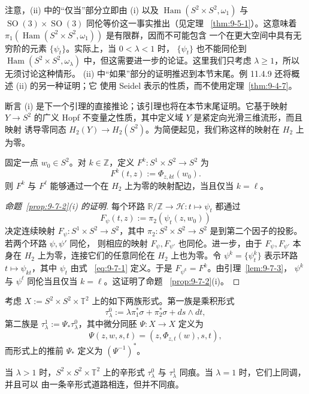 注意，(ii) 中的“仅当”部分立即由 (i) 以及
$\operatorname{Ham}(S^2\times S^2,\omega_1)$ 与
$\operatorname{SO}(3)\times\operatorname{SO}(3)$ 同伦等价这一事实推出（见定理
~\ref{thm:9-5-1}）。这意味着
$\pi_1(\operatorname{Ham}(S^2\times S^2,\omega_1))$ 是有限群，因而不可能包含
一个在更大空间中具有无穷阶的元素 $\{\psi_t\}$。实际上，当 $0<\lambda<1$ 时，
$\{\psi_t\}$ 也不能同伦到 $\operatorname{Ham}(S^2\times S^2,\omega_\lambda)$
中，但这需要进一步的论证。这里我们只考虑 $\lambda\ge1$，所以无须讨论这种情形。
(ii) 中“如果”部分的证明推迟到本节末尾。例 11.4.9 还将概述 (ii) 的另一种证明；它
使用 Seidel 表示的性质，而不使用定理~\ref{thm:9-4-7}。

断言 (i) 是下一个引理的直接推论；该引理也将在本节末尾证明。它基于映射
$Y\to S^2$ 的广义 Hopf 不变量之性质，其中定义域 $Y$ 是紧定向光滑三维流形，而且映射
诱导零同态 $H_2(Y)\to H_2(S^2)$。为简便起见，我们称这样的映射在 $H_2$ 上为零。

\begin{lemma}\label{lem:9-7-3}
固定一点 $w_0\in S^2$。对 $k\in\mathbb Z$，定义
$F^k:S^1\times S^2\to S^2$ 为
\[
  F^k(t,z):=\Phi_{z,kt}(w_0).
\]
则 $F^k$ 与 $F^\ell$ 能够通过一个在 $H_2$ 上为零的映射配边，当且仅当 $k=\ell$。
\end{lemma}

\begin{proof}[命题~\ref{prop:9-7-2}(i) 的证明]
每个环路 $\mathbb R/\mathbb Z\to\mathcal H:t\mapsto\psi_t$ 都通过
\[
  F_\psi(t,z):=\pi_2(\psi_t(z,w_0))
\]
决定连续映射 $F_\psi:S^1\times S^2\to S^2$，其中
$\pi_2:S^2\times S^2\to S^2$ 是到第二个因子的投影。若两个环路 $\psi,\psi'$ 同伦，
则相应的映射 $F_\psi,F_{\psi'}$ 也同伦。进一步，由于 $F_\psi,F_{\psi'}$ 本身在
$H_2$ 上为零，连接它们的任意同伦在 $H_2$ 上也为零。令
$\psi^k=\{\psi_t^k\}$ 表示环路 $t\mapsto\psi_{kt}$，其中 $\psi_t$ 由式
~\eqref{eq:9-7-1} 定义。于是 $F_{\psi^k}=F^k$。由引理~\ref{lem:9-7-3}，
$\psi^k$ 与 $\psi^\ell$ 同伦当且仅当 $k=\ell$。这证明了命题
~\ref{prop:9-7-2}(i)。
\end{proof}

考虑 $X:=S^2\times S^2\times\mathbb T^2$ 上的如下两族形式。第一族是乘积形式
\[
  \tau_\lambda^0:=\lambda\pi_1^*\sigma+\pi_2^*\sigma+ds\wedge dt,
\]
第二族是 $\tau_\lambda^1:=\Psi_*\tau_\lambda^0$，其中微分同胚
$\Psi:X\to X$ 定义为
\[
  \Psi(z,w,s,t)=(z,\Phi_{z,t}(w),s,t),
\]
而形式上的推前 $\Psi_*$ 定义为 $(\Psi^{-1})^*$。

\begin{theorem}\label{thm:9-7-4}
当 $\lambda>1$ 时，$S^2\times S^2\times\mathbb T^2$ 上的辛形式
$\tau_\lambda^0$ 与 $\tau_\lambda^1$ 同痕。当 $\lambda=1$ 时，它们上同调，并且可以
由一条辛形式道路相连，但并不同痕。
\end{theorem}

